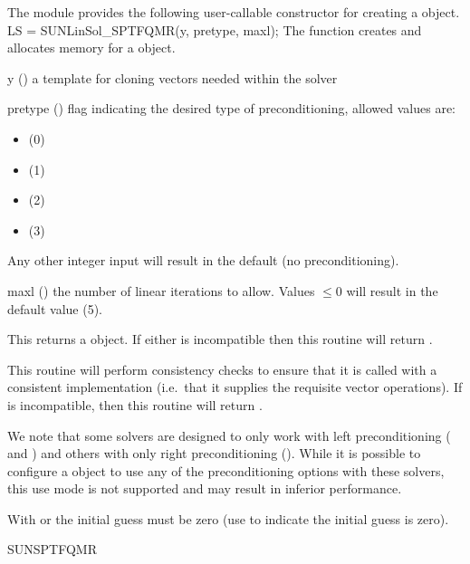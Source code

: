 The {\sunlinsolsptfqmr} module provides the following user-callable constructor
for creating a \newline {} object.
%
%
{
  LS = SUNLinSol\_SPTFQMR(y, pretype, maxl);
}
{
  The function  creates and allocates memory for
  a {\sptfqmr} \newline {} object.
}
{
  \begin{args}[pretype]
  \item[y] ()
    a template for cloning vectors needed within the solver
  \item[pretype] ()
    flag indicating the desired type of preconditioning, allowed
    values are:
    \begin{itemize}
    \item {} (0)
    \item {} (1)
    \item {} (2)
    \item {} (3)
    \end{itemize}
    Any other integer input will result in the default (no
    preconditioning).
  \item[maxl] ()
    the number of linear iterations to allow. Values $\le0$ will
    result in the default value (5).
  \end{args}
}
{
  This returns a  object.  If either  is
  incompatible then this routine will return .
}
{
  This routine will perform consistency checks to ensure that it is
  called with a consistent {\nvector} implementation (i.e.~that it
  supplies the requisite vector operations).  If  is
  incompatible, then this routine will return .

  We note that some {\sundials} solvers are designed to only work
  with left preconditioning ({\ida} and {\idas}) and others with only
  right preconditioning ({\kinsol}). While it is possible to configure
  a {\sunlinsolsptfqmr} object to use any of the preconditioning options
  with these solvers, this use mode is not supported and may result in
  inferior performance.

  With  or  the initial guess must be zero (use
   to indicate the initial guess is zero).
}
{SUNSPTFQMR}
%
